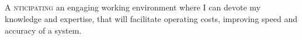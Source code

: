 \documentclass[11pt, a4paper]{article}
\begin{document}
	\begin{center}
		\textcolor{dBlue}{{\HeaderNFont \AuthorFName}\hspace{0.7cm}{\HeaderNFont \AuthorLName}} \\
		\vspace{2pt}
		{\small \textcolor{dBlue}{\CyberPresence}}
		\vspace{-23pt}
	\end{center}
	
	\textcolor{dBlue}{
		\\ \noindent\makebox[\linewidth]{\rule{\textwidth}{2.1pt}}
		\vspace{-21pt} \\
		\noindent\makebox[\linewidth]{\rule{\paperwidth}{3.9pt}}
		\vspace{-13pt} \\
	}
	
	\lettrine{\DropCaps A \hspace{1pt}}{nticipating} an engaging working environment where I can devote my knowledge and expertise, that will facilitate operating costs, improving speed and accuracy of a system.
	
	
	
	\pagebreak
	\pagebreak
\end{document}
